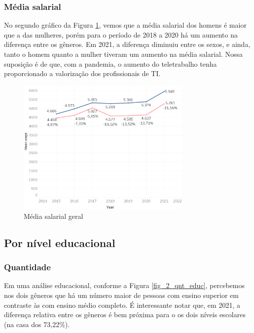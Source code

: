 \subsubsection{Média salarial}

No segundo gráfico da Figura \ref{fig_1_sal}, vemos que a média salarial dos homens é maior que a das mulheres, porém para o período de 2018 a 2020 há um aumento na diferença entre os gêneros. Em 2021, a diferença diminuiu entre os sexos, e ainda, tanto o homem quanto a mulher tiveram um aumento na média salarial. Nossa suposição é de que, com a pandemia, o aumento do teletrabalho tenha proporcionado a valorização dos profissionais de TI.

\begin{figure}[htbp]
	\centerline{
		\includegraphics[width=85mm]{assets/1_sal.PNG}
	}
	\caption{Média salarial geral}
	\label{fig_1_sal}
\end{figure}


\subsection{Por nível educacional}  \label{sub:educ}

\subsubsection{Quantidade}

Em uma análise educacional, conforme a Figura \ref{fig_2_qnt_educ}, percebemos nos dois gêneros que há um número maior de pessoas com ensino superior em contraste às com ensino médio completo. É interessante notar que, em 2021, a diferença relativa entre os gêneros é bem próxima para o os dois níveis escolares (na casa dos 73,22\%).

